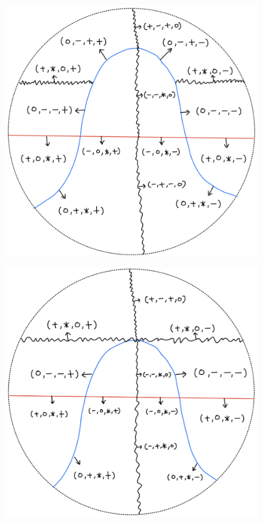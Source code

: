 \begin{definition}
\begin{enumerate}
\begin{itemize}
\begin{figure}[H]
    \centering
    \includegraphics[scale = 0.45]{diagrams/cobord'2/12.png} 
    \caption{}
    \label{fig:your-label}
\end{figure}
\begin{figure}[H]
    \centering
    \includegraphics[scale = 0.45]{diagrams/cobord'2/13.png} 

\end{figure}
\end{itemize}
\end{enumerate}
\end{definition}
